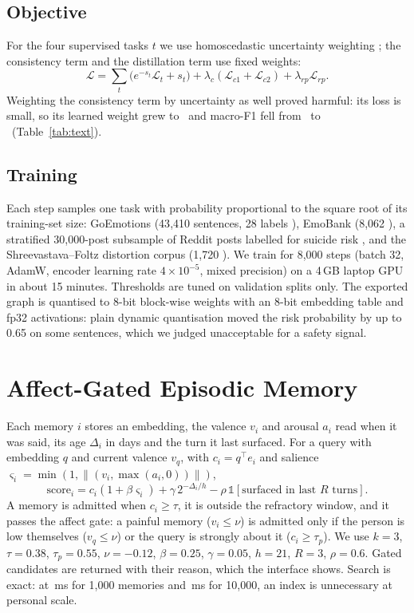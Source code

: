 \documentclass[conference]{IEEEtran}
\begin{document}
\subsection{Objective}
For the four supervised tasks $t$ we use homoscedastic uncertainty weighting \cite{kendall2018}; the consistency term and the distillation term use fixed weights:
\begin{equation}
\mathcal{L} = \sum_t \big(e^{-s_t}\mathcal{L}_t + s_t\big) + \lambda_c(\mathcal{L}_{c1}+\mathcal{L}_{c2}) + \lambda_{rp}\mathcal{L}_{rp}.
\end{equation}
Weighting the consistency term by uncertainty as well proved harmful: its loss is small, so its learned weight grew to \UWweight\ and macro-F1 fell from \EmoDistill\ to \EmoUW\ (Table~\ref{tab:text}).

\subsection{Training}
Each step samples one task with probability proportional to the square root of its training-set size: GoEmotions (43{,}410 sentences, 28 labels \cite{demszky2020}), EmoBank (8{,}062 \cite{buechel2017}), a stratified 30{,}000-post subsample of Reddit posts labelled for suicide risk \cite{komati2021}, and the Shreevastava--Foltz distortion corpus (1{,}720 \cite{shreevastava2021}). We train for 8{,}000 steps (batch 32, AdamW, encoder learning rate $4\times10^{-5}$, mixed precision) on a 4\,GB laptop GPU in about 15 minutes. Thresholds are tuned on validation splits only. The exported graph is quantised to 8-bit block-wise weights with an 8-bit embedding table and fp32 activations: plain dynamic quantisation moved the risk probability by up to 0.65 on some sentences, which we judged unacceptable for a safety signal.

\section{Affect-Gated Episodic Memory}

Each memory $i$ stores an embedding, the valence $v_i$ and arousal $a_i$ read when it was said, its age $\Delta_i$ in days and the turn it last surfaced. For a query with embedding $q$ and current valence $v_q$, with $c_i = q^\top e_i$ and salience $\varsigma_i = \min(1, \lVert(v_i, \max(a_i,0))\rVert)$,
\begin{equation}
\text{score}_i = c_i(1+\beta\varsigma_i) + \gamma\,2^{-\Delta_i/h} - \rho\,\mathbb{1}[\text{surfaced in last } R \text{ turns}].
\end{equation}
A memory is admitted when $c_i \ge \tau$, it is outside the refractory window, and it passes the affect gate: a painful memory ($v_i \le \nu$) is admitted only if the person is low themselves ($v_q \le \nu$) or the query is strongly about it ($c_i \ge \tau_p$). We use $k{=}3$, $\tau{=}0.38$, $\tau_p{=}0.55$, $\nu{=}{-}0.12$, $\beta{=}0.25$, $\gamma{=}0.05$, $h{=}21$, $R{=}3$, $\rho{=}0.6$. Gated candidates are returned with their reason, which the interface shows. Search is exact: at \AgemThousand\,ms for 1{,}000 memories and \AgemTenK\,ms for 10{,}000, an index is unnecessary at personal scale.
\end{document}
